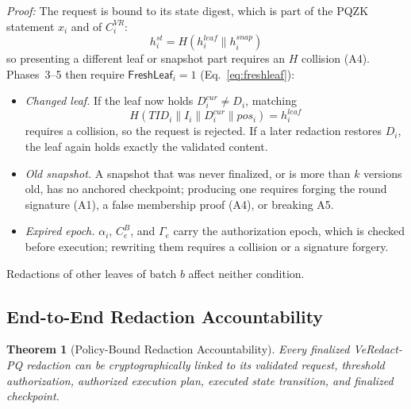 \documentclass[lettersize,journal]{IEEEtran}
\newtheorem{theorem}{Theorem}
\begin{document}
\emph{Proof:} The request is bound to its state digest, which is part
of the PQZK statement $x_i$ and of $C_i^{VR}$:
\begin{equation}
h_i^{st}=H(h_i^{leaf}\parallel h_i^{snap})
\end{equation}
so presenting a different leaf or snapshot part requires an $H$
collision (A4). Phases~3--5 then require
$\mathsf{FreshLeaf}_i=1$ (Eq.~\eqref{eq:freshleaf}):
\begin{itemize}[leftmargin=*,nosep]
\item \emph{Changed leaf.} If the leaf now holds $D_i^{cur}\neq D_i$,
matching
\begin{equation}
H(TID_i\parallel I_i\parallel D_i^{cur}\parallel pos_i)=h_i^{leaf}
\end{equation}
requires a collision, so the request is rejected. If a later redaction
restores $D_i$, the leaf again holds exactly the validated content.
\item \emph{Old snapshot.} A snapshot that was never finalized, or is
more than $k$ versions old, has no anchored checkpoint; producing one
requires forging the round signature (A1), a false membership proof
(A4), or breaking A5.
\item \emph{Expired epoch.} $\alpha_i$, $C_e^B$, and $\Gamma_e$ carry the
authorization epoch, which is checked before execution; rewriting them
requires a collision or a signature forgery.
\end{itemize}
Redactions of other leaves of batch $b$ affect neither condition.

\subsection{End-to-End Redaction Accountability}

\begin{theorem}[Policy-Bound Redaction Accountability]
Every finalized VeRedact-PQ redaction can be cryptographically linked
to its validated request, threshold authorization, authorized execution
plan, executed state transition, and finalized checkpoint.
\end{theorem}
\end{document}
